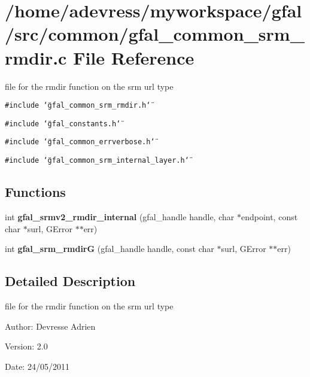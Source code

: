 \section{/home/adevress/myworkspace/gfal/src/common/gfal\_\-common\_\-srm\_\-rmdir.c File Reference}
\label{gfal__common__srm__rmdir_8c}
file for the rmdir function on the srm url type 

{\tt \#include \char`\"{}gfal\_\-common\_\-srm\_\-rmdir.h\char`\"{}}\par
{\tt \#include \char`\"{}gfal\_\-constants.h\char`\"{}}\par
{\tt \#include \char`\"{}gfal\_\-common\_\-errverbose.h\char`\"{}}\par
{\tt \#include \char`\"{}gfal\_\-common\_\-srm\_\-internal\_\-layer.h\char`\"{}}\par
\subsection*{Functions}
\begin{CompactItemize}
\item 
int \textbf{gfal\_\-srmv2\_\-rmdir\_\-internal} (gfal\_\-handle handle, char $\ast$endpoint, const char $\ast$surl, GError $\ast$$\ast$err)\label{gfal__common__srm__rmdir_8c_22d081b3d5ca26d2e9cce6de8ee3be1c}

\item 
int \textbf{gfal\_\-srm\_\-rmdir\-G} (gfal\_\-handle handle, const char $\ast$surl, GError $\ast$$\ast$err)\label{gfal__common__srm__rmdir_8c_4c8ec8a7f1716aa19a83fc94dda6b08e}

\end{CompactItemize}


\subsection{Detailed Description}
file for the rmdir function on the srm url type 

\begin{Desc}
\item[Author:]Devresse Adrien \end{Desc}
\begin{Desc}
\item[Version:]2.0 \end{Desc}
\begin{Desc}
\item[Date:]24/05/2011 \end{Desc}
